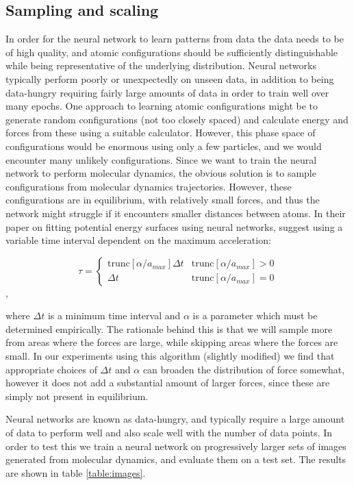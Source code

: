 \subsection{Sampling and scaling}
In order for the neural network to learn patterns from data
the data needs to be of high quality, and atomic configurations
should be sufficiently distinguishable while being representative
of the underlying distribution. Neural networks typically perform
poorly or unexpectedly on unseen data, in addition to being data-hungry
requiring fairly large amounts of data in order to train well
over many epochs.
One approach to learning atomic configurations might be to generate
random configurations (not too closely spaced) and calculate energy
and forces from these using a suitable calculator. However, this
phase space of configurations would be enormous using only a few particles,
and we would encounter many unlikely configurations.
Since we want to train the neural network to perform molecular dynamics,
the obvious solution is to sample configurations from molecular dynamics
trajectories. However, these configurations are in equilibrium, with
relatively small forces, and thus the network might struggle if
it encounters smaller distances between atoms.
In their paper on fitting potential energy surfaces using neural networks,
\parencite[Pukrittayakamee et al.]{pukrittayakamee2009simultaneous}
suggest using a variable time interval dependent on the maximum acceleration:

\begin{equation}
    \tau = 
    \begin{cases}
        \text{trunc}[\alpha / a_{max}]\Delta t & \text{trunc}
        [\alpha / a_{max}] > 0 \\
        \Delta t & \text{trunc}
        [\alpha / a_{max}] = 0
    \end{cases}
\end{equation},

where $\Delta t$ is a minimum time interval and $\alpha$ is a parameter
which must be determined empirically.
The rationale behind this is that we will sample more from
areas where the forces are large, while skipping areas
where the forces are small.
In our experiments using this algorithm (slightly modified)
we find that appropriate choices of $\Delta t$ and $\alpha$
can broaden the distribution of force somewhat, however
it does not add a substantial amount of larger forces, since
these are simply not present in equilibrium.
\par
Neural networks are known as data-hungry, and typically require
a large amount of data to perform well and also scale well
with the number of data points. In order to test this we train a neural
network on progressively larger sets of images generated from molecular dynamics,
and evaluate them on a test set.
The results are shown in table \ref{table:images}.

